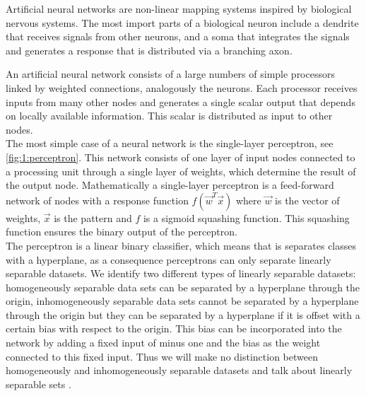 Artificial neural networks are non-linear mapping systems inspired by biological nervous systems. The most import parts of a biological neuron include a dendrite that receives signals from other neurons, and a soma that integrates the signals and generates a response that is distributed via a branching axon. 

An artificial neural network consists of a large numbers of simple processors linked by weighted connections, analogously the neurons. Each processor receives inputs from many other nodes and generates a single scalar output that depends on locally available information. This scalar is distributed as input to other nodes. \\

The most simple case of a neural network is the single-layer perceptron, see \autoref{fig:1:perceptron}. This network consists of one layer of input nodes connected to a processing unit through a single layer of weights, which determine the result of the output node. Mathematically a single-layer perceptron is a feed-forward network of nodes with a response function $f(\vec{w}^T\vec{x})$ where $\vec{w}$ is the vector of weights, $\vec{x}$ is the pattern and $f$ is a sigmoid squashing function\cite{reed1998neural}. This squashing function ensures the binary output of the perceptron. \\

The perceptron is a linear binary classifier, which means that is separates classes with a hyperplane, as a consequence perceptrons can only separate linearly separable datasets. We identify two different types of linearly separable datasets: homogeneously separable data sets can be separated by a hyperplane through the origin, inhomogeneously separable data sets cannot be separated by a hyperplane through the origin but they can be separated by a hyperplane if it is offset with a certain bias with respect to the origin. This bias can be incorporated into the network by adding a fixed input of minus one and the bias as the weight connected to this fixed input. Thus we will make no distinction between homogeneously and inhomogeneously separable datasets and talk about linearly separable sets \cite[Chapter 4]{rojas1996neural}.

